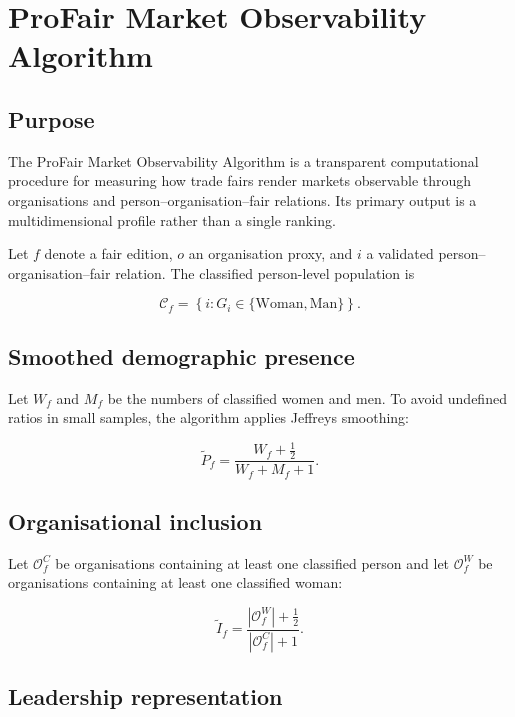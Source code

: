 \section{ProFair Market Observability Algorithm}
\label{sec:profair-algorithm}

\subsection{Purpose}

The ProFair Market Observability Algorithm is a transparent computational
procedure for measuring how trade fairs render markets observable through
organisations and person--organisation--fair relations. Its primary output is
a multidimensional profile rather than a single ranking.

Let $f$ denote a fair edition, $o$ an organisation proxy, and $i$ a validated
person--organisation--fair relation. The classified person-level population is

\begin{equation}
\mathcal{C}_{f}
=
\left\{
i:
G_i \in \{\mathrm{Woman},\mathrm{Man}\}
\right\}.
\end{equation}

\subsection{Smoothed demographic presence}

Let $W_f$ and $M_f$ be the numbers of classified women and men. To avoid
undefined ratios in small samples, the algorithm applies Jeffreys smoothing:

\begin{equation}
\widetilde{P}_{f}
=
\frac{W_f+\frac{1}{2}}
{W_f+M_f+1}.
\end{equation}

\subsection{Organisational inclusion}

Let $\mathcal{O}_{f}^{C}$ be organisations containing at least one classified
person and let $\mathcal{O}_{f}^{W}$ be organisations containing at least one
classified woman:

\begin{equation}
\widetilde{I}_{f}
=
\frac{
|\mathcal{O}_{f}^{W}|+\frac{1}{2}
}{
|\mathcal{O}_{f}^{C}|+1
}.
\end{equation}

\subsection{Leadership representation}

